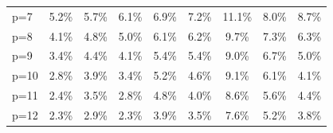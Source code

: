\begin{table}[htbp]
\begin{tabular}{l|cccccccc}
p=7 & 5.2\% & 5.7\% & 6.1\% & 6.9\% & 7.2\% & 11.1\% & 8.0\% & 8.7\% \\
p=8 & 4.1\% & 4.8\% & 5.0\% & 6.1\% & 6.2\% & 9.7\% & 7.3\% & 6.3\% \\
p=9 & 3.4\% & 4.4\% & 4.1\% & 5.4\% & 5.4\% & 9.0\% & 6.7\% & 5.0\% \\
p=10 & 2.8\% & 3.9\% & 3.4\% & 5.2\% & 4.6\% & 9.1\% & 6.1\% & 4.1\% \\
p=11 & 2.4\% & 3.5\% & 2.8\% & 4.8\% & 4.0\% & 8.6\% & 5.6\% & 4.4\% \\
p=12 & 2.3\% & 2.9\% & 2.3\% & 3.9\% & 3.5\% & 7.6\% & 5.2\% & 3.8\% \\
\bottomrule
\end{tabular}
\end{table}
